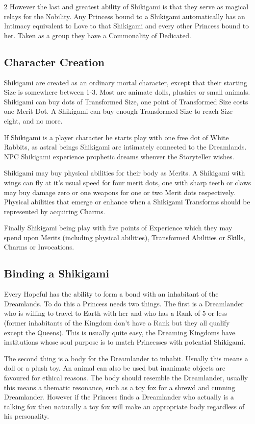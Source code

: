 \begin{multicols}{2}
However the last and greatest ability of Shikigami is that they serve as magical relays for the Nobility. Any Princess bound to a Shikigami automatically has an Intimacy equivalent to Love to that Shikigami and every other Princess bound to her. Taken as a group they have a Commonality of Dedicated.

\subsection*{Character Creation}

Shikigami are created as an ordinary mortal character, except that their starting Size is somewhere between 1-3. Most are animate dolls, plushies or small animals. Shikigami can buy dots of Transformed Size, one point of Transformed Size costs one Merit Dot. A Shikigami can buy enough Transformed Size to reach Size eight, and no more.

If Shikigami is a player character he starts play with one free dot of White Rabbits, as astral beings Shikigami are intimately connected to the Dreamlands. NPC Shikigami experience prophetic dreams whenver the Storyteller wishes. 

Shikigami may buy physical abilities for their body as Merits. A Shikigami with wings can fly at it's usual speed for four merit dots, one with sharp teeth or claws may buy damage zero or one weapons for one or two Merit dots respectively. Physical abilities that emerge or enhance when a Shikigami Transforms should be represented by acquiring Charms. 

Finally Shikigami being play with five points of Experience which they may spend upon Merits (including physical abilities), Transformed Abilities or Skills, Charms or Invocations.

\subsection*{Binding a Shikigami}

Every Hopeful has the ability to form a bond with an inhabitant of the Dreamlands. To do this a Princess needs two things. The first is a Dreamlander who is willing to travel to Earth with her and who has a Rank of 5 or less (former inhabitants of the Kingdom don't have a Rank but they all qualify except the Queens). This is usually quite easy, the Dreaming Kingdoms have institutions whose soul purpose is to match Princesses with potential Shikigami. 

The second thing is a body for the Dreamlander to inhabit. Usually this means a doll or a plush toy. An animal can also be used but inanimate objects are favoured for ethical reasons. The body should resemble the Dreamlander, usually this means a thematic resonance, such as a toy fox for a shrewd and cunning Dreamlander. However if the Princess finds a Dreamlander who actually is a talking fox then naturally a toy fox will make an appropriate body regardless of his personality. 


\end{multicols}
